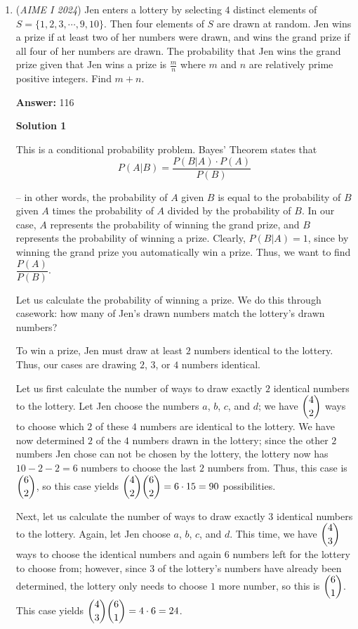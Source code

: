 \begin{enumerate}
 Thus, only 0 (mod 5) and 2 (mod 5)s work. This is 809. 

 


	\item (\textit{AIME I 2024}) Jen enters a lottery by selecting $4$ distinct elements of $S=\{1,2,3,\cdots,9,10\}.$ Then four elements of $S$ are drawn at random. Jen wins a prize if at least two of her numbers were drawn, and wins the grand prize if all four of her numbers are drawn. The probability that Jen wins the grand prize given that Jen wins a prize is $\frac{m}{n}$ where $m$ and $n$ are relatively prime positive integers. Find $m+n$.


 
 \textbf{Answer: }116



\textbf{Solution 1}

This is a conditional probability problem. Bayes' Theorem states that 
 \[P(A|B)=\dfrac{P(B|A)\cdot P(A)}{P(B)}\]

 -- in other words, the probability of $A$ given $B$ is equal to the probability of $B$ given $A$ times the probability of $A$ divided by the probability of $B$. In our case, $A$ represents the probability of winning the grand prize, and $B$ represents the probability of winning a prize. Clearly, $P(B|A)=1$, since by winning the grand prize you automatically win a prize. Thus, we want to find $\dfrac{P(A)}{P(B)}$. 

 Let us calculate the probability of winning a prize. We do this through casework: how many of Jen's drawn numbers match the lottery's drawn numbers? 

 To win a prize, Jen must draw at least $2$ numbers identical to the lottery. Thus, our cases are drawing $2$, $3$, or $4$ numbers identical. 

 Let us first calculate the number of ways to draw exactly $2$ identical numbers to the lottery. Let Jen choose the numbers $a$, $b$, $c$, and $d$; we have $\dbinom42$ ways to choose which $2$ of these $4$ numbers are identical to the lottery. We have now determined $2$ of the $4$ numbers drawn in the lottery; since the other $2$ numbers Jen chose can not be chosen by the lottery, the lottery now has $10-2-2=6$ numbers to choose the last $2$ numbers from. Thus, this case is $\dbinom62$, so this case yields $\dbinom42\dbinom62=6\cdot15=90$ possibilities. 

 Next, let us calculate the number of ways to draw exactly $3$ identical numbers to the lottery. Again, let Jen choose $a$, $b$, $c$, and $d$. This time, we have $\dbinom43$ ways to choose the identical numbers and again $6$ numbers left for the lottery to choose from; however, since $3$ of the lottery's numbers have already been determined, the lottery only needs to choose $1$ more number, so this is $\dbinom61$. This case yields $\dbinom43\dbinom61=4\cdot6=24$. 


\end{enumerate}
